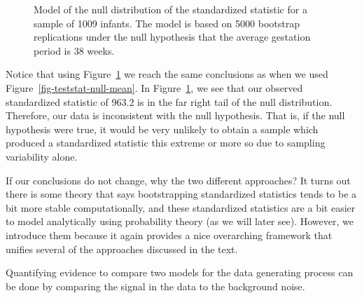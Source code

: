 \documentclass[
  letterpaper,
  DIV=11,
  numbers=noendperiod]{scrreprt}
\theoremstyle{plain}
\theoremstyle{definition}
\theoremstyle{definition}
\theoremstyle{remark}
\begin{document}
\begin{figure}


\caption{\label{fig-teststat-null}Model of the null distribution of the
standardized statistic for a sample of 1009 infants. The model is based
on 5000 bootstrap replications under the null hypothesis that the
average gestation period is 38 weeks.}

\end{figure}%

Notice that using Figure~\ref{fig-teststat-null} we reach the same
conclusions as when we used Figure~\ref{fig-teststat-null-mean}. In
Figure~\ref{fig-teststat-null}, we see that our observed standardized
statistic of 963.2 is in the far right tail of the null distribution.
Therefore, our data is inconsistent with the null hypothesis. That is,
if the null hypothesis were true, it would be very unlikely to obtain a
sample which produced a standardized statistic this extreme or more so
due to sampling variability alone.

If our conclusions do not change, why the two different approaches? It
turns out there is some theory that says bootstrapping standardized
statistics tends to be a bit more stable computationally, and these
standardized statistics are a bit easier to model analytically using
probability theory (as we will later see). However, we introduce them
because it again provides a nice overarching framework that unifies
several of the approaches discussed in the text.

\begin{tcolorbox}[enhanced jigsaw, breakable, titlerule=0mm, colframe=quarto-callout-tip-color-frame, bottomtitle=1mm, opacityback=0, rightrule=.15mm, toptitle=1mm, arc=.35mm, bottomrule=.15mm, left=2mm, title=\textcolor{quarto-callout-tip-color}{\faLightbulb}\hspace{0.5em}{Big Idea}, leftrule=.75mm, coltitle=black, toprule=.15mm, colbacktitle=quarto-callout-tip-color!10!white, colback=white, opacitybacktitle=0.6]

Quantifying evidence to compare two models for the data generating
process can be done by comparing the signal in the data to the
background noise.

\end{tcolorbox}
\end{document}
